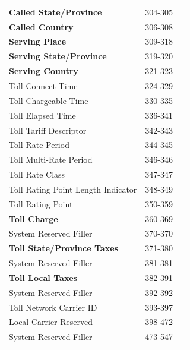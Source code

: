 \documentclass[12pt,twoside]{article}
\begin{document}
\begin{longtable}{lrl}
 \textbf{Called State/Province}            &            304-305  &                        \\
 \textbf{Called Country}                   &            306-308  &                        \\
 \textbf{Serving Place}                    &            309-318  &                        \\
 \textbf{Serving State/Province}           &            319-320  &                        \\
 \textbf{Serving Country}                  &            321-323  &                        \\
 Toll Connect Time                         &            324-329  &                        \\
 Toll Chargeable Time                      &            330-335  &                        \\
 Toll Elapsed Time                         &            336-341  &                        \\
 Toll Tariff Descriptor                    &            342-343  &                        \\
 Toll Rate Period                          &            344-345  &                        \\
 Toll Multi-Rate Period                    &            346-346  &                        \\
 Toll Rate Class                           &            347-347  &                        \\
 Toll Rating Point Length Indicator        &            348-349  &                        \\
 Toll Rating Point                         &            350-359  &                        \\
 \textbf{Toll Charge}                      &            360-369  &                        \\
 System Reserved Filler                    &            370-370  &                        \\
 \textbf{Toll State/Province Taxes}        &            371-380  &                        \\
 System Reserved Filler                    &            381-381  &                        \\
 \textbf{Toll Local Taxes}                 &            382-391  &                        \\
 System Reserved Filler                    &            392-392  &                        \\
 Toll Network Carrier ID                   &            393-397  &                        \\
 Local Carrier Reserved                    &            398-472  &                        \\
 System Reserved Filler                    &            473-547  &                        \\
\hline
\end{longtable}
\end{document}
